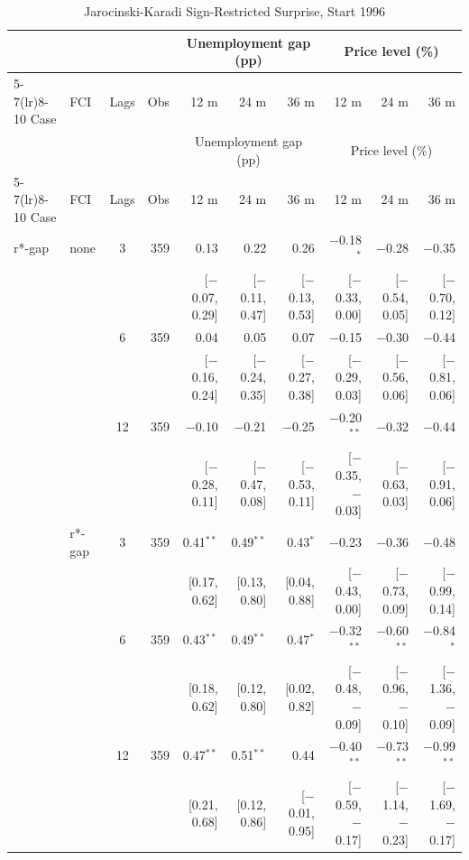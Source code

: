 \begingroup\scriptsize\setlength{\tabcolsep}{0.9pt}
\begin{longtable}{llcrrrrrrr}
\caption{Jarocinski-Karadi Sign-Restricted Surprise, Start 1996}\label{tab:appR5b}\\
\toprule
 & & & & \multicolumn{3}{c}{Unemployment gap (pp)} & \multicolumn{3}{c}{Price level (\%)}\\ \cmidrule(lr){5-7}\cmidrule(lr){8-10}
Case & FCI & Lags & Obs & 12 m & 24 m & 36 m & 12 m & 24 m & 36 m\\
\midrule\endfirsthead
\toprule
 & & & & \multicolumn{3}{c}{Unemployment gap (pp)} & \multicolumn{3}{c}{Price level (\%)}\\ \cmidrule(lr){5-7}\cmidrule(lr){8-10}
Case & FCI & Lags & Obs & 12 m & 24 m & 36 m & 12 m & 24 m & 36 m\\
\midrule\endhead
\bottomrule\endfoot
r*-gap & none & 3 & 359 & 0.13 & 0.22 & 0.26 & $-$0.18$^{*}$ & $-$0.28 & $-$0.35\\
 & & & & {\scriptsize [$-$0.07, 0.29]} & {\scriptsize [$-$0.11, 0.47]} & {\scriptsize [$-$0.13, 0.53]} & {\scriptsize [$-$0.33, 0.00]} & {\scriptsize [$-$0.54, 0.05]} & {\scriptsize [$-$0.70, 0.12]}\\
 &  & 6 & 359 & 0.04 & 0.05 & 0.07 & $-$0.15 & $-$0.30 & $-$0.44\\
 & & & & {\scriptsize [$-$0.16, 0.24]} & {\scriptsize [$-$0.24, 0.35]} & {\scriptsize [$-$0.27, 0.38]} & {\scriptsize [$-$0.29, 0.03]} & {\scriptsize [$-$0.56, 0.06]} & {\scriptsize [$-$0.81, 0.06]}\\
 &  & 12 & 359 & $-$0.10 & $-$0.21 & $-$0.25 & $-$0.20$^{**}$ & $-$0.32 & $-$0.44\\
 & & & & {\scriptsize [$-$0.28, 0.11]} & {\scriptsize [$-$0.47, 0.08]} & {\scriptsize [$-$0.53, 0.11]} & {\scriptsize [$-$0.35, $-$0.03]} & {\scriptsize [$-$0.63, 0.03]} & {\scriptsize [$-$0.91, 0.06]}\\
 & r*-gap & 3 & 359 & 0.41$^{**}$ & 0.49$^{**}$ & 0.43$^{*}$ & $-$0.23 & $-$0.36 & $-$0.48\\
 & & & & {\scriptsize [0.17, 0.62]} & {\scriptsize [0.13, 0.80]} & {\scriptsize [0.04, 0.88]} & {\scriptsize [$-$0.43, 0.00]} & {\scriptsize [$-$0.73, 0.09]} & {\scriptsize [$-$0.99, 0.14]}\\
 &  & 6 & 359 & 0.43$^{**}$ & 0.49$^{**}$ & 0.47$^{*}$ & $-$0.32$^{**}$ & $-$0.60$^{**}$ & $-$0.84$^{*}$\\
 & & & & {\scriptsize [0.18, 0.62]} & {\scriptsize [0.12, 0.80]} & {\scriptsize [0.02, 0.82]} & {\scriptsize [$-$0.48, $-$0.09]} & {\scriptsize [$-$0.96, $-$0.10]} & {\scriptsize [$-$1.36, $-$0.09]}\\
 &  & 12 & 359 & 0.47$^{**}$ & 0.51$^{**}$ & 0.44 & $-$0.40$^{**}$ & $-$0.73$^{**}$ & $-$0.99$^{**}$\\
 & & & & {\scriptsize [0.21, 0.68]} & {\scriptsize [0.12, 0.86]} & {\scriptsize [$-$0.01, 0.95]} & {\scriptsize [$-$0.59, $-$0.17]} & {\scriptsize [$-$1.14, $-$0.23]} & {\scriptsize [$-$1.69, $-$0.17]}\\
\end{longtable}
